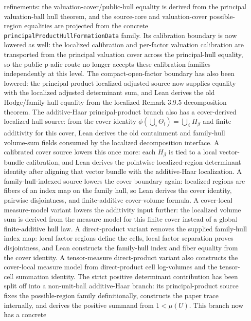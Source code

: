 \begin{proposition}
  refinements: the valuation-cover/public-hull equality is derived from the
  principal valuation-ball hull theorem, and the source-core and valuation-cover
  possible-region equalities are projected from the concrete
  \texttt{principalProductHullFormationData} family.  Its calibration boundary
  is now lowered as well: the localized calibration and per-factor valuation
  calibration are transported from the principal valuation cover across the
  principal-hull equality, so the public p-adic route no longer accepts these
  calibration families independently at this level.
  The compact-open-factor boundary has also been lowered: the principal-product
  localized-adjusted source now supplies equality with the localized adjusted
  determinant sum, and Lean derives the old Hodge/family-hull equality from
  the localized Remark 3.9.5 decomposition theorem.  The additive-Haar
  principal-product branch also has a cover-derived localized hull source:
  from the cover identity
  \(\phi(\bigcup_i\Theta_i)=\bigcup_\beta H_\beta\) and finite additivity for
  this cover, Lean derives the old containment and family-hull volume-sum
  fields consumed by the localized decomposition interface.  A calibrated cover
  source lowers this once more: each \(H_\beta\) is tied to a local
  vector-bundle calibration, and Lean derives the pointwise localized-region
  determinant identity after aligning that vector bundle with the additive-Haar
  localization.  A family-hull-indexed source lowers the cover boundary again:
  localized regions are fibers of an index map on the family hull, so Lean
  derives the cover identity, pairwise disjointness, and finite-additive
  cover-volume formula.  A cover-local measure-model variant lowers the
  additivity input further: the localized volume sum is derived from the
  measure model for this finite cover instead of a global finite-additive hull
  law.  A direct-product variant removes the supplied family-hull index map:
  local factor regions define the cells, local factor separation proves
  disjointness, and Lean constructs the family-hull index and fiber equality
  from the cover identity.  A tensor-measure direct-product variant also
  constructs the cover-local measure model from direct-product cell
  log-volumes and the tensor-cell summation identity.  The strict positive
  determinant contribution has been split off into a non-unit-ball
  additive-Haar branch: its principal-product source fixes the possible-region
  family definitionally, constructs the paper trace internally, and derives the
  positive summand from \(1<\mu(U)\).  This branch now has a concrete

\end{proposition}
